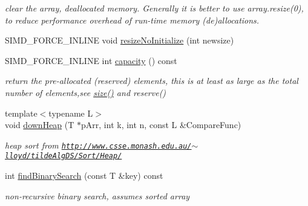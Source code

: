 \begin{CompactItemize}
\begin{CompactList}\small\item\em clear the array, deallocated memory. Generally it is better to use array.resize(0), to reduce performance overhead of run-time memory (de)allocations. \item\end{CompactList}\item 
SIMD\_\-FORCE\_\-INLINE void \hyperlink{classbt_aligned_object_array_2cc58c74534181a7a10e5c6ab8b21227}{resizeNoInitialize} (int newsize)
\item 
\hypertarget{classbt_aligned_object_array_fcfda91263ff04e1efcbe62bf68e2d1d}{
SIMD\_\-FORCE\_\-INLINE int \hyperlink{classbt_aligned_object_array_fcfda91263ff04e1efcbe62bf68e2d1d}{capacity} () const }
\label{classbt_aligned_object_array_fcfda91263ff04e1efcbe62bf68e2d1d}

\begin{CompactList}\small\item\em return the pre-allocated (reserved) elements, this is at least as large as the total number of elements,see \hyperlink{classbt_aligned_object_array_6bdd14c7599ecb95e8d83dd5a715f9b7}{size()} and reserve() \item\end{CompactList}\item 
\hypertarget{classbt_aligned_object_array_81c857b52a4f6bcf8f3a6a53bc91889a}{
{\footnotesize template$<$typename L$>$ }\\void \hyperlink{classbt_aligned_object_array_81c857b52a4f6bcf8f3a6a53bc91889a}{downHeap} (T $\ast$pArr, int k, int n, const L \&CompareFunc)}
\label{classbt_aligned_object_array_81c857b52a4f6bcf8f3a6a53bc91889a}

\begin{CompactList}\small\item\em heap sort from \href{http://www.csse.monash.edu.au/~lloyd/tildeAlgDS/Sort/Heap/}{\tt http://www.csse.monash.edu.au/$\sim$lloyd/tildeAlgDS/Sort/Heap/} \item\end{CompactList}\item 
\hypertarget{classbt_aligned_object_array_9c72e0a8fa512a04e11fe8c31b09260a}{
int \hyperlink{classbt_aligned_object_array_9c72e0a8fa512a04e11fe8c31b09260a}{findBinarySearch} (const T \&key) const }
\label{classbt_aligned_object_array_9c72e0a8fa512a04e11fe8c31b09260a}

\begin{CompactList}\small\item\em non-recursive binary search, assumes sorted array \item\end{CompactList}\end{CompactItemize}


